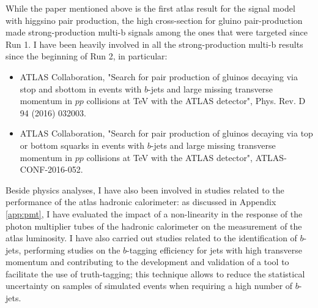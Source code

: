 While the paper mentioned above is the first \gls{atlas} result for the signal model with higgsino pair production, 
the high cross-section for gluino pair-production made strong-production multi-b signals among the ones that were targeted since Run 1. 
I have been heavily involved in all the strong-production multi-b results since the beginning of Run 2, in particular:

\begin{itemize}
\item ATLAS Collaboration, "Search for pair production of gluinos decaying via stop and sbottom in events with $b$-jets and large missing transverse momentum in $pp$ collisions at \cmtre TeV with the ATLAS detector", Phys. Rev. D 94 (2016) 032003.
\item ATLAS Collaboration, "Search for pair production of gluinos decaying via top or bottom squarks in events with $b$-jets and large missing transverse momentum in
$pp$ collisions at \cmtre TeV with the ATLAS detector", ATLAS-CONF-2016-052.
\end{itemize}

Beside physics analyses, I have also been involved in studies related to the performance of the \gls{atlas} hadronic calorimeter: 
as discussed in Appendix \ref{app:pmt}, I have evaluated the impact of a non-linearity in the response of the photon multiplier tubes of the 
hadronic calorimeter on the measurement of the \gls{atlas} luminosity. 
I have also carried out studies related to the identification of $b$-jets, 
performing studies on the $b$-tagging efficiency for jets with high transverse momentum and contributing to 
the development and validation of a tool to facilitate the use of truth-tagging; this technique 
allows to reduce the statistical uncertainty on samples of simulated events when requiring a high number of $b$-jets. 


